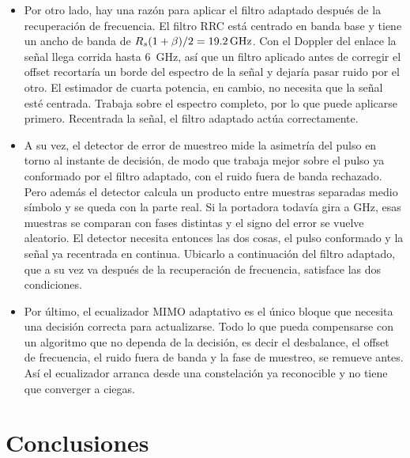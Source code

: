 \begin{itemize}
Con el orden correcto el EVM es el mismo para todo $\phi$ entre \ang{0} y
\ang{20}, lo que indica que el ortogonalizador remueve el desbalance por
completo. Con el orden invertido el deterioro crece con $\phi$ hasta
\SI{1.21}{\dB}. La $\BER$ pasa de \num{7.6e-4} a \num{2.9e-3}, a un factor
\num{1.3} del umbral HD-FEC.

\item Por otro lado, hay una raz\'on para aplicar el filtro adaptado despu\'es
de la recuperaci\'on de frecuencia. El filtro RRC est\'a centrado en banda
base y tiene un ancho de banda de
$R_{s}(1+\beta)/2 = \SI{19.2}{\giga\hertz}$. Con el Doppler del enlace la
se\~nal llega corrida hasta \SI{6}{\giga\hertz}, as\'i que un filtro aplicado
antes de corregir el offset recortar\'ia un borde del espectro de la se\~nal y
dejar\'ia pasar ruido por el otro. El estimador de cuarta potencia, en cambio,
no necesita que la se\~nal est\'e centrada. Trabaja sobre el espectro completo,
por lo que puede aplicarse primero. Recentrada la se\~nal, el filtro adaptado
act\'ua correctamente.

\item A su vez, el detector de error de muestreo mide la asimetr\'ia del pulso
en torno al instante de decisi\'on, de modo que trabaja mejor sobre el pulso
ya conformado por el filtro adaptado, con el ruido fuera de banda rechazado.
Pero adem\'as el detector calcula un producto entre muestras separadas medio
s\'imbolo y se queda con la parte real. Si la portadora todav\'ia gira a GHz,
esas muestras se comparan con fases distintas y el signo del error se vuelve
aleatorio. El detector necesita entonces las dos cosas, el pulso conformado y
la se\~nal ya recentrada en continua. Ubicarlo a continuaci\'on del filtro
adaptado, que a su vez va despu\'es de la recuperaci\'on de frecuencia,
satisface las dos condiciones.

\item Por \'ultimo, el ecualizador MIMO adaptativo es el \'unico bloque que
necesita una decisi\'on correcta para actualizarse. Todo lo que pueda
compensarse con un algoritmo que no dependa de la decisi\'on, es decir el
desbalance, el offset de frecuencia, el ruido fuera de banda y la fase de
muestreo, se remueve antes. As\'i el ecualizador arranca desde una
constelaci\'on ya reconocible y no tiene que converger a ciegas.

\end{itemize}

\section{Conclusiones}
\label{sec:dsp-conclusiones}


